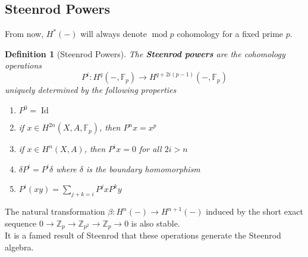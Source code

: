 \documentclass[11pt, a4paper]{article}
\DeclareMathOperator*{\id}{Id}
\DeclareMathOperator*{\cmod}{mod}
\newtheorem{defn}{Definition}
\theoremstyle{plain}
\begin{document}
\subsection{Steenrod Powers}
From now, $H^{\ast}( -) $ will always denote $\cmod p$ cohomology for a fixed prime $p$.
\begin{defn}[Steenrod Powers]
	The \textbf{Steenrod powers} are the cohomology operations 
	\[ 
		P^{i}\colon H^{q}( -, \mathbb{F}_p) \to H^{q+ 2i ( p-1) }( -, \mathbb{F}_p) 
	\]
	uniquely determined by the following properties
	\begin{enumerate}
	\item $P^{0}= \id$ 
	\item if $x \in H^{2n}( X,A, \mathbb{F}_p) $, then $P^{n}x = x^{p}$ 
	\item if $x \in H^{n}( X,A) $, then $P^{i}x =0$ for all $2i >n$ 
	\item $\delta P^{i} = P^{i}\delta$ where $\delta$ is the boundary homomorphism
	\item $P^{i}( xy) = \sum_{j+k=i} P^{j}x P^{k}y$
	\end{enumerate}
\end{defn}
The natural transformation $\beta\colon H^{n}( -) \to H^{n+1}( -) $ induced by the short exact sequence $0 \to \mathbb{Z}_p \to \mathbb{Z}_{p^{2}} \to \mathbb{Z}_p \to 0$ is also stable.\\
It is a famed result of Steenrod that these operations generate the Steenrod algebra.
\end{document}

